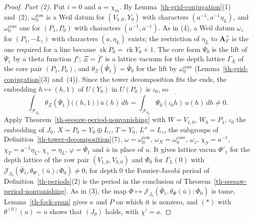 \begin{proof}
\emph{Part (2).} Put $i=0$ and $a=\chi_m$. By Lemma~\ref{th-grid-conjugation}(1)
and~(2), $\omega^{\mathrm{row}}_0$ is a Weil datum for $(V_{1,0},Y_0)$ with
characters $(a^{-1},a^{-1}\eta_L)$, and $\omega^{\mathrm{core}}_0$ one for
$(P_1,P_0)$ with characters $(a^{-1},a^{-1})$. As in (4), a Weil datum
$\omega_z$ for $(P_1,-L_z)$ with characters $(a,\eta_L)$ exists; the
restriction of $\eta_L$ to $\mathbf A_F^\times$ is the one required for a line
because $\operatorname{rk}P_0=\operatorname{rk}Y_0+1$. The core form $\Psi_0$ is
the lift of $\Psi_1$ by a theta function $f'$; $\Xi=\bar f'$ is a lattice vacuum
for the depth lattice $\Gamma_X$ of the core pair $(P_1,P_0)$, and
$\theta_\Xi(\bar\Psi_1)=\bar\Psi_0$ for the lift by $\omega^{\mathrm{core}}_0$
(Lemma~\ref{th-grid-conjugation}(3) and~(4)). Since the tower decomposition fits
the ends, the embedding $h\mapsto(h,1)$ of $U(Y_0)$ in $U(P_0)$ is $\iota_0$, so
\[
\int_{\mathcal F_{Y_0}}\theta_\Xi(\bar\Psi_1)\bigl((h,1)\bigr)\,\bar u(h)\,dh
=\overline{\int_{\mathcal F_{Y_0}}\Psi_0(\iota_0h)\,u(h)\,dh}\neq0 .
\]
Apply Theorem~\ref{th-seesaw-period-nonvanishing} with $W=V_{1,0}$,
$W_0=P_1$, $\iota_0$ the embedding of $J_0$, $X=P_0=Y_0\oplus L_z$, $T=Y_0$,
$L''=L_z$, the subgroups of Definition~\ref{th-tower-decomposition}(7),
$\omega=\omega^{\mathrm{row}}_0$, $\omega_X=\omega^{\mathrm{core}}_0$, $\omega_z$,
$\chi_S=a^{-1}$, $\chi_T=a^{-1}\eta_L$, $\chi_z=\eta_L$, $\varphi=\bar\Psi_1$
and $\bar u$ in place of $u$. It gives lattice vacua $\Phi'_1$ for the depth
lattice of the row pair $(V_{1,0},V_{0,0})$ and $\Phi_0$ for $\Gamma_L(0)$ with
$\mathcal J_{J_0}(\bar\Psi_1,\theta_{\Phi'_1}(\bar u);\Phi_0)\neq0$; for depth
$0$ the Fourier-Jacobi period of Definition~\ref{th-periods}(2) is the period in
the conclusion of Theorem~\ref{th-seesaw-period-nonvanishing}. As in (3), the
map $\Phi\mapsto\mathcal J_{J_0}(\bar\Psi_1,\theta_\Phi(\bar u);\Phi_0)$ is tame,
Lemma~\ref{th-fock-span} gives $\kappa$ and $P$ on which it is nonzero, and
$(*)$ with $\theta^{(0)}(u)=u$ shows that $(J_0)$ holds, with $\chi'=a$.
\end{proof}

